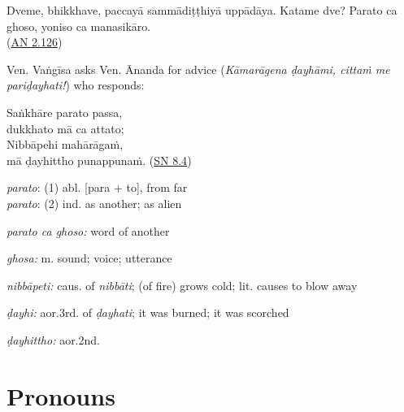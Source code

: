 \documentclass[11pt,oneside]{memoir}
\begin{document}
\begin{widecols}
Dveme, bhikkhave, paccayā sammādiṭṭhiyā uppādāya. Katame dve? Parato ca ghoso, yoniso ca manasikāro. \\
(\href{https://suttacentral.net/an2.118-129/pli/ms}{AN 2.126})

Ven. Vaṅgīsa asks Ven. Ānanda for advice (\emph{Kāmarāgena ḍayhāmi, cittaṁ me pariḍayhati!}) who responds:

Saṅkhāre parato passa, \\
dukkhato mā ca attato; \\
Nibbāpehi mahārāgaṁ, \\
mā ḍayhittho punappunaṁ. (\href{https://suttacentral.net/sn8.4/pli/ms}{SN 8.4})

\columnbreak

\emph{parato}: (1) abl. [para + to], from far \\
\emph{parato}: (2) ind. as another; as alien

\emph{parato ca ghoso:} word of another

\emph{ghosa:} m. sound; voice; utterance

\emph{nibbāpeti:} caus. of \emph{nibbāti}; (of fire) grows cold; lit. causes to blow away

\emph{ḍayhi:} aor.3rd. of \emph{ḍayhati}; it was burned; it was scorched

\emph{ḍayhittho:} aor.2nd.
\end{widecols}

\clearpage
\section{Pronouns}
\label{sec:orgb3e7a91}
\end{document}
